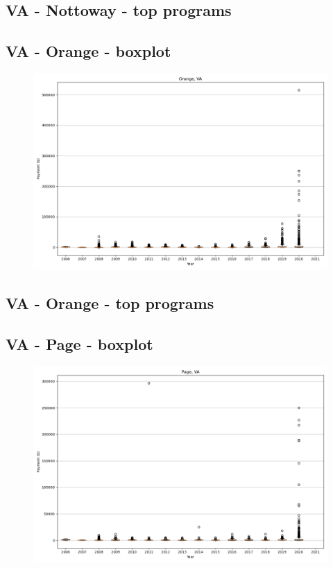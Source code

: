 \subsection*{VA - Nottoway - top programs}

\newpage
\subsection*{VA - Orange - boxplot}
\begin{figure}[h]
\centering
\includegraphics[width=7in]{../output/boxplots/counties/Orange-VA_boxplot.png}
\end{figure}


\subsection*{VA - Orange - top programs}

\newpage
\subsection*{VA - Page - boxplot}
\begin{figure}[h]
\centering
\includegraphics[width=7in]{../output/boxplots/counties/Page-VA_boxplot.png}
\end{figure}


